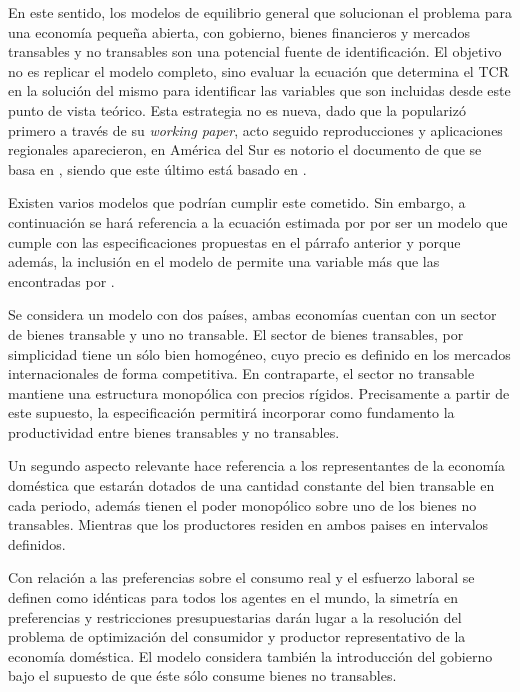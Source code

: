 \documentclass[12pt,letterpaper]{article}
\begin{document}
En este sentido, los modelos de equilibrio general que solucionan el problema para una economía pequeña abierta, con gobierno, bienes financieros y mercados transables y no transables son una potencial fuente de identificación. El objetivo no es replicar el modelo completo, sino evaluar la ecuación que determina el TCR en la solución del mismo para identificar las variables que son incluidas desde este punto de vista teórico. Esta estrategia no es nueva, dado que \cite{lane2004trans} la popularizó primero a través de su \emph{working paper}, acto seguido reproducciones y aplicaciones regionales aparecieron, en América del Sur es notorio el documento de \cite{Calderon2004exchange} que se basa en \cite{Calderon2002panel}, siendo que este último está basado en \cite{Obstfeld1995dynamics}.

Existen varios modelos que podrían cumplir este cometido. Sin embargo, a continuación se hará referencia a la ecuación estimada por \cite{Calderon2004exchange} por ser un modelo que cumple con las especificaciones propuestas en el párrafo anterior y porque además, la inclusión en el modelo de \cite{Calderon2002panel} permite una variable más que las encontradas por \cite{lane2004trans}.

Se considera un modelo con dos países, ambas economías cuentan con un sector de bienes transable y uno no transable. El sector de bienes transables, por simplicidad tiene un sólo bien homogéneo, cuyo precio es definido en los mercados internacionales de forma competitiva. En contraparte, el sector no transable mantiene una estructura monopólica con precios rígidos. Precisamente a partir de este supuesto, la especificación permitirá incorporar como fundamento la productividad entre bienes transables y no transables. 

Un segundo aspecto relevante hace referencia a los representantes de la economía doméstica que estarán dotados de una cantidad constante del bien transable en cada periodo, además tienen el poder monopólico sobre uno de los bienes no transables. Mientras que los productores residen en ambos paises en intervalos definidos. 

Con relación a las preferencias sobre el consumo real y el esfuerzo laboral se definen como idénticas para todos los agentes en el mundo, la simetría en preferencias y restricciones presupuestarias darán lugar a la resolución del problema de optimización del consumidor y productor representativo de la economía doméstica. El modelo considera también la introducción del gobierno bajo el supuesto de que éste sólo consume bienes no transables.  
\end{document}

